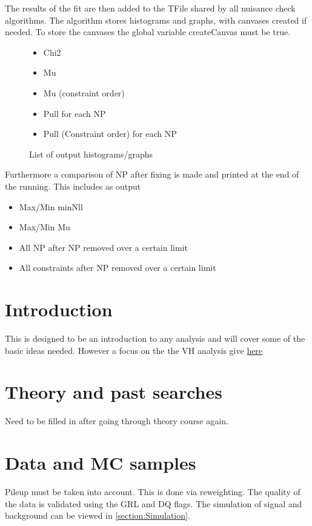 \documentclass[idxtotoc,hyperref,openany]{labbook} %
\begin{document}
\newpage
{}
The results of the fit are then added to the TFile shared by all nuisance check algorithms. The algorithm stores histograms and graphs, with canvases created if needed. To store the canvases the global variable createCanvas must be true.
\begin{figure}[H] 
\begin{itemize}
\item Chi2
\item Mu
\item Mu (constraint order)
\item Pull for each NP
\item Pull (Constraint order) for each NP
\end{itemize}
\caption{List of output histograms/graphs}
\end{figure}


Furthermore a comparison of NP after fixing is made and printed at the end of the running. This includes as output
\begin{itemize}
\item Max/Min minNll
\item Max/Min Mu
\item All NP after NP removed over a certain limit
\item All constraints after NP removed over a certain limit
\end{itemize}

\section{Introduction}
This is designed to be an introduction to any analysis and will cover some of the basic ideas needed. However a focus on the the VH analysis give \href{https://cds.cern.ch/record/2054042/files/ATL-COM-PHYS-2015-1180.pdf}{here}

\section{Theory and past searches}
Need to be filled in after going through theory course again.

\section{Data and MC samples}

Pileup must be taken into account. This is done via reweighting. The quality of the data is validated using the GRL and DQ flags. The simulation of signal and background can be viewed in \ref{section:Simulation}. 
\end{document}
